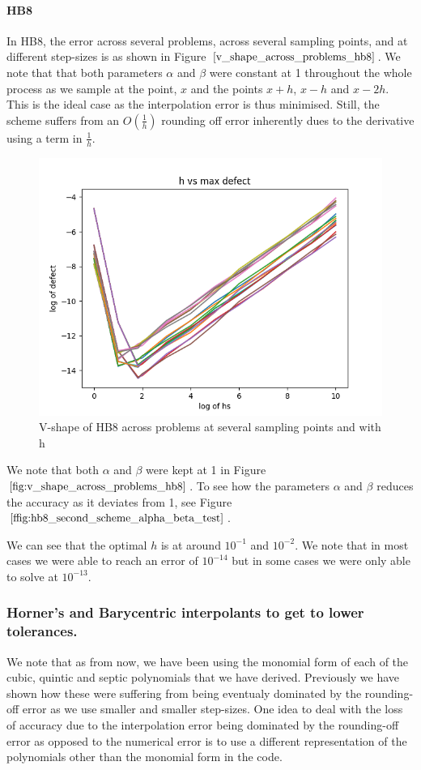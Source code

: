 \documentclass{article}
\begin{document}
\paragraph{HB8}
In HB8, the error across several problems, across several sampling points, and at different step-sizes is as shown in Figure $\ref{v_shape_across_problems_hb8}$. We note that that both parameters $\alpha$ and $\beta$ were constant at 1 throughout the whole process as we sample at the point, $x$ and the points $x+h$, $x-h$ and $x-2h$. This is the ideal case as the interpolation error is thus minimised. Still, the scheme suffers from an $O(\frac{1}{h})$ rounding off error inherently dues to the derivative using a term in $\frac{1}{h}$.

\begin{figure}[H]
\centering
\includegraphics[width=0.7\linewidth]{./figures/v_shape_across_problems_hb8}
\caption{V-shape of HB8 across problems at several sampling points and with h}
\label{fig:v_shape_across_problems_hb8}
\end{figure}

We note that both $\alpha$ and $\beta$ were kept at 1 in Figure $\ref{fig:v_shape_across_problems_hb8}$. To see how the parameters $\alpha$ and $\beta$ reduces the accuracy as it deviates from 1, see Figure $\ref{ffig:hb8_second_scheme_alpha_beta_test}$.

We can see that the optimal $h$ is at around $10^{-1}$ and $10^{-2}$. We note that in most cases we were able to reach an error of $10^{-14}$ but in some cases we were only able to solve at $10^{-13}$. 

\subsubsection{Horner's and Barycentric interpolants to get to lower tolerances.}
We note that as from now, we have been using the monomial form of each of the cubic, quintic and septic polynomials that we have derived. Previously we have shown how these were suffering from being eventualy dominated by the rounding-off error as we use smaller and smaller step-sizes. One idea to deal with the loss of accuracy due to the interpolation error being dominated by the rounding-off error as opposed to the numerical error is to use a different representation of the polynomials other than the monomial form in the code. 
\end{document}
